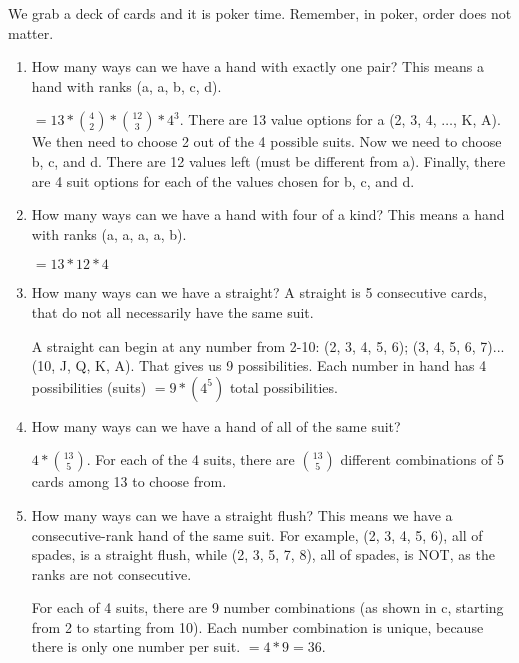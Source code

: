 \vspace{1 cm}
\question 
We grab a deck of cards and it is poker time. Remember, in poker, order does not matter. 
\begin{enumerate}[label=(\alph*)]
\item
How many ways can we have a hand with exactly one pair? This means a hand with ranks (a, a, b, c, d).
\begin{solution} [.3 cm]
$= 13 * {4 \choose 2} * {12 \choose 3} * 4^3$.
There are 13 value options for a (2, 3, 4, $\dots$, K, A). We then need to choose 2 out of the 4 possible suits. Now we need to choose b, c, and d. There are 12 values left (must be different from a). Finally, there are 4 suit options for each of the values chosen for b, c, and d.
\end{solution}
\item How many ways can we have a hand with four of a kind? This means a hand with ranks (a, a, a, a, b).
\begin{solution}[.3 cm] $= 13 * 12 * 4$ \end{solution}

\item How many ways can we have a straight? A straight is 5 consecutive cards, that do not all necessarily have the same suit. 
\begin{solution} [.3 cm]
A straight can begin at any number from 2-10: (2, 3, 4, 5, 6); (3, 4, 5, 6, 7)...(10, J, Q, K, A). That gives us 9 possibilities. Each number in hand has 4 possibilities (suits) $ = 9 * (4^5)$ total possibilities.
\end{solution}
\item How many ways can we have a hand of all of the same suit? 
\begin{solution} [0.3 cm] $4 * {13 \choose 5}$.
For each of the 4 suits, there are ${13 \choose 5}$ different combinations of 5 cards among 13 to choose from. 
\end{solution}
\item How many ways can we have a straight flush? This means we have a consecutive-rank hand of the same suit. For example, (2, 3, 4, 5, 6), all of spades, is a straight flush, while (2, 3, 5, 7, 8), all of spades, is NOT, as the ranks are not consecutive. 
\begin{solution}[.3 cm]
For each of 4 suits, there are 9 number combinations (as shown in c, starting from 2 to starting from 10). Each number combination is unique, because there is only one number per suit.
$= 4 * 9 = 36$.
\end{solution}

\end{enumerate}